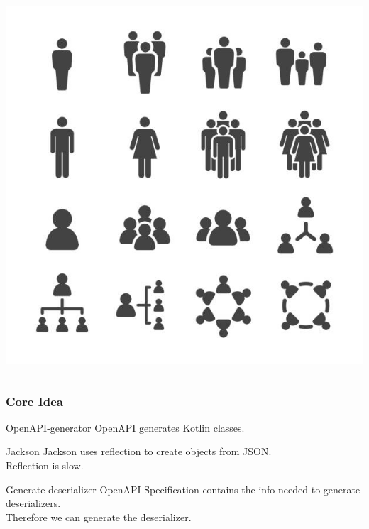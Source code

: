 \documentclass{beamer}
\begin{document}
\begin{frame}
\begin{columns}[c]
\begin{column}{.32\textwidth}
\begin{center}
                    \includegraphics[width=\textwidth]{images/freg-bilde.jpg}
                \end{center}
            \end{column}
        \end{columns}
    \end{frame}


    \begin{frame}
        \frametitle{Core Idea}
        \begin{block}{OpenAPI-generator}
            OpenAPI generates Kotlin classes.
        \end{block}
        \begin{block}{Jackson}
            Jackson uses reflection to create objects from JSON. \\
            Reflection is slow.
        \end{block}
        \begin{block}{Generate deserializer}
            OpenAPI Specification contains the info needed to generate deserializers. \\
            Therefore we can generate the deserializer.
        \end{block}
    \end{frame}
\end{document}
